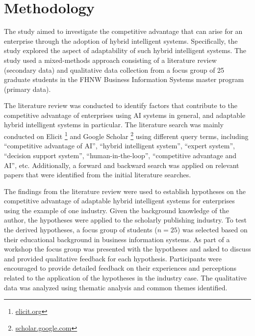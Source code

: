 \section{Methodology}
\label{sec:methods}

The study aimed to investigate the competitive advantage that can arise for an enterprise
through the adoption of hybrid intelligent systems. Specifically, the study explored the aspect of adaptability
of such hybrid intelligent systems. The study used a mixed-methods approach consisting of a literature
review (secondary data) and qualitative data collection from a focus group of 25 graduate students in the
FHNW Business Information Systems master program (primary data).

The literature review was conducted to identify factors that contribute to the competitive advantage
of enterprises using AI systems in general, and adaptable hybrid intelligent systems in particular.
The literature search was mainly conducted on Elicit \footnote{\href{https://elicit.org/}{elicit.org}}
and Google Scholar \footnote{\href{https://scholar.google.com/}{scholar.google.com}} using different
query terms, including ``competitive advantage of AI'', ``hybrid intelligent system'',
``expert system'', ``decision support system'', ``human-in-the-loop'', ``competitive advantage and AI'',
etc. Additionally, a forward and backward search was applied on relevant papers that were identified
from the initial literature searches.

The findings from the literature review were used to establish hypotheses on the competitive advantage
of adaptable hybrid intelligent systems for enterprises using the example of one industry. Given the
background knowledge of the author, the hypotheses were applied to the scholarly publishing industry.
To test the derived hypotheses, a focus group of students ($n = 25$) was selected based on their educational
background in business information systems. As part of a workshop the focus group was presented with the
hypotheses and asked to discuss and provided qualitative feedback for each hypothesis. Participants were
encouraged to provide detailed feedback on their experiences and perceptions related to the application
of the hypotheses in the industry case. The qualitative data was analyzed using thematic analysis and
common themes identified.